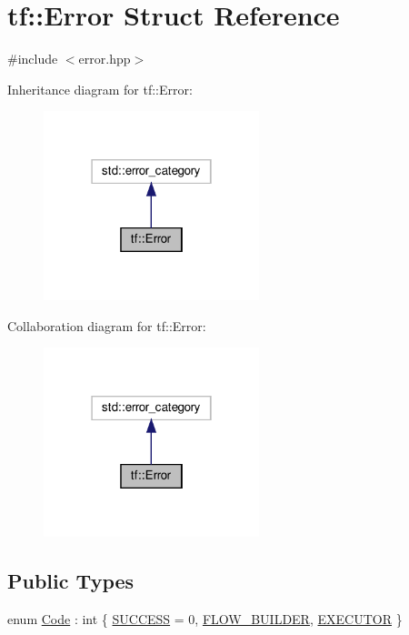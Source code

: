\hypertarget{structtf_1_1Error}{}\section{tf\+:\+:Error Struct Reference}
\label{structtf_1_1Error}


{\ttfamily \#include $<$error.\+hpp$>$}



Inheritance diagram for tf\+:\+:Error\+:\nopagebreak
\begin{figure}[H]
\begin{center}
\leavevmode
\includegraphics[width=178pt]{structtf_1_1Error__inherit__graph}
\end{center}
\end{figure}


Collaboration diagram for tf\+:\+:Error\+:\nopagebreak
\begin{figure}[H]
\begin{center}
\leavevmode
\includegraphics[width=178pt]{structtf_1_1Error__coll__graph}
\end{center}
\end{figure}
\subsection*{Public Types}
\begin{DoxyCompactItemize}
\item 
enum \hyperlink{structtf_1_1Error_aad6732b815bfe4ae3cea402042ee43a3}{Code} \+: int \{ \hyperlink{structtf_1_1Error_aad6732b815bfe4ae3cea402042ee43a3acfa4fd6143c71e68422b942ea4137bd8}{S\+U\+C\+C\+E\+SS} = 0, 
\hyperlink{structtf_1_1Error_aad6732b815bfe4ae3cea402042ee43a3a473f4090f21daf6a44dfa954277922d0}{F\+L\+O\+W\+\_\+\+B\+U\+I\+L\+D\+ER}, 
\hyperlink{structtf_1_1Error_aad6732b815bfe4ae3cea402042ee43a3a55ebe8318d63f4c36ae93b0ec26dc9b2}{E\+X\+E\+C\+U\+T\+OR}
 \}
\end{DoxyCompactItemize}
